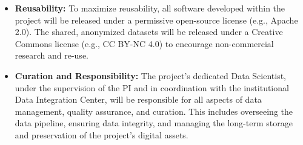 \documentclass[11pt, a4paper]{article}
\begin{document}
\begin{itemize}
    \item \textbf{Reusability:} To maximize reusability, all software developed within the project will be released under a permissive open-source license (e.g., Apache 2.0). The shared, anonymized datasets will be released under a Creative Commons license (e.g., CC BY-NC 4.0) to encourage non-commercial research and re-use.
    \item \textbf{Curation and Responsibility:} The project's dedicated Data Scientist, under the supervision of the PI and in coordination with the institutional Data Integration Center, will be responsible for all aspects of data management, quality assurance, and curation. This includes overseeing the data pipeline, ensuring data integrity, and managing the long-term storage and preservation of the project's digital assets.
\end{itemize}
\end{document}
